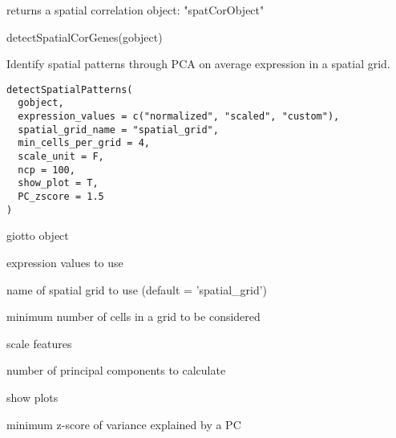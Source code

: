 \documentclass[a4paper]{book}
\begin{document}
%
\begin{Value}
returns a spatial correlation object: "spatCorObject"
\end{Value}
%
\begin{SeeAlso}\relax
{}
\end{SeeAlso}
%
\begin{Examples}
\begin{ExampleCode}
    detectSpatialCorGenes(gobject)
\end{ExampleCode}
\end{Examples}
%
\begin{Description}\relax
Identify spatial patterns through PCA on average expression in a spatial grid.
\end{Description}
%
\begin{Usage}
\begin{verbatim}
detectSpatialPatterns(
  gobject,
  expression_values = c("normalized", "scaled", "custom"),
  spatial_grid_name = "spatial_grid",
  min_cells_per_grid = 4,
  scale_unit = F,
  ncp = 100,
  show_plot = T,
  PC_zscore = 1.5
)
\end{verbatim}
\end{Usage}
%
\begin{Arguments}
\begin{ldescription}
\item[\code{gobject}] giotto object

\item[\code{expression\_values}] expression values to use

\item[\code{spatial\_grid\_name}] name of spatial grid to use (default = 'spatial\_grid')

\item[\code{min\_cells\_per\_grid}] minimum number of cells in a grid to be considered

\item[\code{scale\_unit}] scale features

\item[\code{ncp}] number of principal components to calculate

\item[\code{show\_plot}] show plots

\item[\code{PC\_zscore}] minimum z-score of variance explained by a PC
\end{ldescription}
\end{Arguments}
\end{document}
